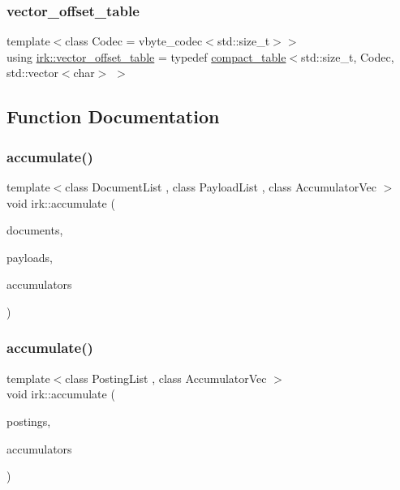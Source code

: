 \mbox{\label{namespaceirk_a6d042444ebc87e3036291ec5656b0c51}} 
\subsubsection{\texorpdfstring{vector\+\_\+offset\+\_\+table}{vector\_offset\_table}}
{\footnotesize\ttfamily template$<$class Codec  = vbyte\+\_\+codec$<$std\+::size\+\_\+t$>$$>$ \\
using \mbox{\hyperlink{namespaceirk_a6d042444ebc87e3036291ec5656b0c51}{irk\+::vector\+\_\+offset\+\_\+table}} = typedef \mbox{\hyperlink{classirk_1_1compact__table}{compact\+\_\+table}}$<$std\+::size\+\_\+t, Codec, std\+::vector$<$char$>$ $>$}



\subsection{Function Documentation}
\mbox{\label{namespaceirk_a900198dc6bc592a13980c42e25f7757b}} 
\subsubsection{\texorpdfstring{accumulate()}{accumulate()}\hspace{0.1cm}{\footnotesize\ttfamily [1/2]}}
{\footnotesize\ttfamily template$<$class Document\+List , class Payload\+List , class Accumulator\+Vec $>$ \\
void irk\+::accumulate (\begin{DoxyParamCaption}\item[{const Document\+List \&}]{documents,  }\item[{const Payload\+List \&}]{payloads,  }\item[{Accumulator\+Vec \&}]{accumulators }\end{DoxyParamCaption})}

\mbox{\label{namespaceirk_ae640de6acba59596ef10cdc51b79103c}} 
\subsubsection{\texorpdfstring{accumulate()}{accumulate()}\hspace{0.1cm}{\footnotesize\ttfamily [2/2]}}
{\footnotesize\ttfamily template$<$class Posting\+List , class Accumulator\+Vec $>$ \\
void irk\+::accumulate (\begin{DoxyParamCaption}\item[{const Posting\+List \&}]{postings,  }\item[{Accumulator\+Vec \&}]{accumulators }\end{DoxyParamCaption})}

